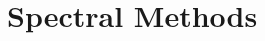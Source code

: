 \documentclass{article}
\begin{document}












\section{Spectral Methods}
\label{SpectralMethods}
\end{document}
